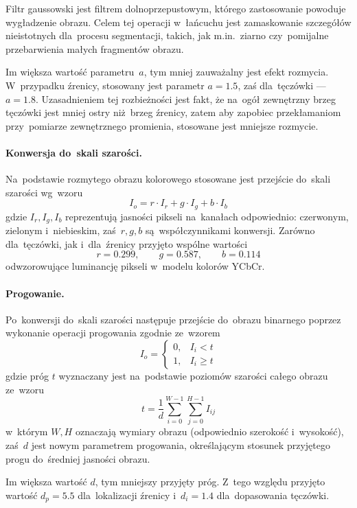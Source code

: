 \documentclass[11pt,a4paper]{article}
\begin{document}
Filtr gaussowski jest filtrem dolnoprzepustowym, którego zastosowanie powoduje wygładzenie obrazu.
Celem tej operacji w~łańcuchu jest zamaskowanie szczegółów nieistotnych dla~procesu segmentacji, takich, jak m.in.~ziarno czy~pomijalne przebarwienia małych fragmentów obrazu.

Im większa wartość parametru~$a$, tym mniej zauważalny jest efekt rozmycia.
W~przypadku źrenicy, stosowany jest parametr $a = 1.5$, zaś dla~tęczówki --- $a = 1.8$.
Uzasadnieniem tej rozbieżności jest fakt, że na~ogół zewnętrzny brzeg tęczówki jest mniej ostry niż~brzeg źrenicy, zatem aby zapobiec przekłamaniom przy~pomiarze zewnętrznego promienia, stosowane jest mniejsze rozmycie.

\paragraph{Konwersja do~skali szarości.}
Na~podstawie rozmytego obrazu kolorowego stosowane jest przejście do~skali szarości wg~wzoru
$$ I_o = r \cdot I_r + g \cdot I_g + b \cdot I_b $$
gdzie $I_r, I_g, I_b$ reprezentują jasności pikseli na~kanałach odpowiednio: czerwonym, zielonym i~niebieskim, zaś~$r, g, b$ są~współczynnikami konwersji.
Zarówno dla~tęczówki, jak i~dla~źrenicy przyjęto wspólne wartości
$$ r = 0.299, \qquad g = 0.587, \qquad b = 0.114 $$
odwzorowujące luminancję pikseli w~modelu kolorów YCbCr.

\paragraph{Progowanie.}
Po~konwersji do~skali szarości następuje przejście do~obrazu binarnego poprzez wykonanie operacji progowania zgodnie ze~wzorem
$$ I_o = \begin{cases}
    0, & I_i < t \\
    1, & I_i \geq t
\end{cases} $$
gdzie próg $t$ wyznaczany jest na~podstawie poziomów szarości całego obrazu ze~wzoru
$$ t = \frac{1}{d} \sum_{i = 0}^{W - 1} \sum_{j = 0}^{H - 1} I_{ij} $$
w~którym $W, H$ oznaczają wymiary obrazu (odpowiednio szerokość i~wysokość), zaś~$d$ jest nowym parametrem progowania, określającym stosunek przyjętego progu do~średniej jasności obrazu.

Im większa wartość $d$, tym mniejszy przyjęty próg.
Z~tego względu przyjęto wartość $d_p = 5.5$ dla~lokalizacji źrenicy i~$d_i = 1.4$ dla~dopasowania tęczówki.
\end{document}
